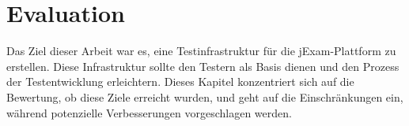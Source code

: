 \chapter{Evaluation}\label{ch:evaluation}

Das Ziel dieser Arbeit war es, eine Testinfrastruktur f\"ur 
die jExam-Plattform zu erstellen. Diese Infrastruktur sollte den
Testern als Basis dienen und den Prozess der Testentwicklung
erleichtern. Dieses Kapitel konzentriert sich auf die Bewertung,
ob diese Ziele erreicht wurden, und geht auf die Einschr\"ankungen 
ein, w\"ahrend potenzielle Verbesserungen vorgeschlagen werden.


